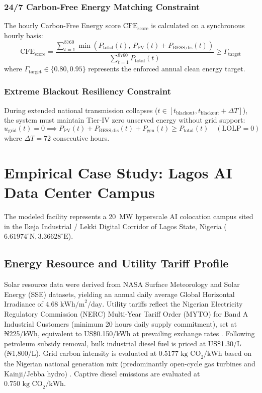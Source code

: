 \documentclass[12pt,3p,review]{elsarticle}
\begin{document}
\subsubsection{24/7 Carbon-Free Energy Matching Constraint}
The hourly Carbon-Free Energy score $\text{CFE}_{\text{score}}$ is calculated on a synchronous hourly basis:
\begin{equation}
    \text{CFE}_{\text{score}} = \frac{\sum_{t=1}^{8760} \min\left( P_{\text{total}}(t), \, P_{\text{PV}}(t) + P_{\text{BESS,dis}}(t) \right)}{\sum_{t=1}^{8760} P_{\text{total}}(t)} \ge \Gamma_{\text{target}}
    \label{eq:cfe}
\end{equation}
where $\Gamma_{\text{target}} \in \{0.80, 0.95\}$ represents the enforced annual clean energy target.

\subsubsection{Extreme Blackout Resiliency Constraint}
During extended national transmission collapses ($t \in [t_{\text{blackout}}, t_{\text{blackout}} + \Delta T]$), the system must maintain Tier-IV zero unserved energy without grid support:
\begin{equation}
    u_{\text{grid}}(t) = 0 \implies P_{\text{PV}}(t) + P_{\text{BESS,dis}}(t) + P_{\text{gen}}(t) \ge P_{\text{total}}(t) \quad (\text{LOLP} = 0)
    \label{eq:resilience}
\end{equation}
where $\Delta T = 72$ consecutive hours.

\section{Empirical Case Study: Lagos AI Data Center Campus}
\label{sec:case}

The modeled facility represents a 20~MW hyperscale AI colocation campus sited in the Ikeja Industrial / Lekki Digital Corridor of Lagos State, Nigeria ($6.61974^\circ\text{N}, 3.36628^\circ\text{E}$). 

\subsection{Energy Resource and Utility Tariff Profile}
Solar resource data were derived from NASA Surface Meteorology and Solar Energy (SSE) datasets, yielding an annual daily average Global Horizontal Irradiance of $4.68\text{ kWh/m}^2/\text{day}$. Utility tariffs reflect the Nigerian Electricity Regulatory Commission (NERC) Multi-Year Tariff Order (MYTO) for Band A Industrial Customers (minimum 20 hours daily supply commitment), set at ₦225/kWh, equivalent to US\$0.150/kWh at prevailing exchange rates \cite{NERC2024}. Following petroleum subsidy removal, bulk industrial diesel fuel is priced at US\$1.30/L (₦1,800/L). Grid carbon intensity is evaluated at $0.5177\text{ kg CO}_2/\text{kWh}$ based on the Nigerian national generation mix (predominantly open-cycle gas turbines and Kainji/Jebba hydro) \cite{Babatunde2020}. Captive diesel emissions are evaluated at $0.750\text{ kg CO}_2/\text{kWh}$.
\end{document}
